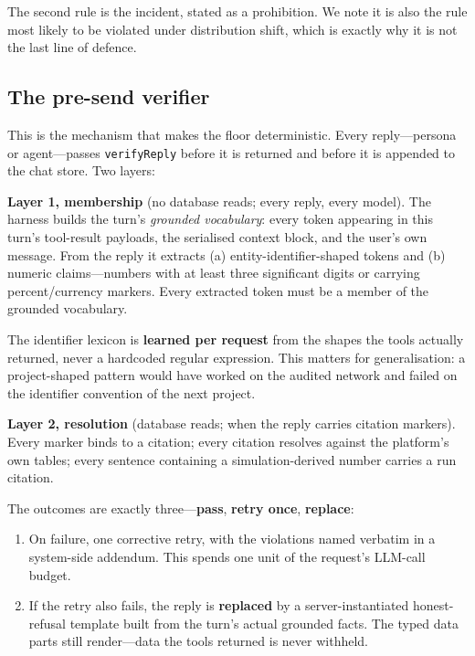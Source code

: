 \documentclass[conference]{IEEEtran}
\begin{document}
The second rule is the incident, stated as a prohibition. We note it is also the
rule most likely to be violated under distribution shift, which is exactly why it
is not the last line of defence.

\subsection{The pre-send verifier}
\label{sec:verifier}

This is the mechanism that makes the floor deterministic. Every reply---persona
or agent---passes \texttt{verifyReply} before it is returned and before it is
appended to the chat store. Two layers:

\textbf{Layer 1, membership} (no database reads; every reply, every model). The
harness builds the turn's \emph{grounded vocabulary}: every token appearing in
this turn's tool-result payloads, the serialised context block, and the user's
own message. From the reply it extracts (a) entity-identifier-shaped tokens and
(b) numeric claims---numbers with at least three significant digits or carrying
percent/currency markers. Every extracted token must be a member of the grounded
vocabulary.

The identifier lexicon is \textbf{learned per request} from the shapes the tools
actually returned, never a hardcoded regular expression. This matters for
generalisation: a project-shaped pattern would have worked on the audited network
and failed on the identifier convention of the next project.

\textbf{Layer 2, resolution} (database reads; when the reply carries citation
markers). Every marker binds to a citation; every citation resolves against the
platform's own tables; every sentence containing a simulation-derived number
carries a run citation.

The outcomes are exactly three---\textbf{pass}, \textbf{retry once},
\textbf{replace}:

\begin{enumerate}
  \item On failure, one corrective retry, with the violations named verbatim in a
        system-side addendum. This spends one unit of the request's LLM-call
        budget.
  \item If the retry also fails, the reply is \textbf{replaced} by a
        server-instantiated honest-refusal template built from the turn's actual
        grounded facts. The typed data parts still render---data the tools
        returned is never withheld.
\end{enumerate}
\end{document}
